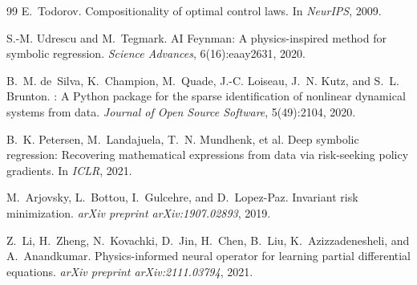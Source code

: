\documentclass[twoside,11pt]{article}
\begin{document}
\begin{thebibliography}{99}
E.~Todorov.
\newblock Compositionality of optimal control laws.
\newblock In \emph{NeurIPS}, 2009.

S.-M. Udrescu and M.~Tegmark.
\newblock AI Feynman: A physics-inspired method for symbolic regression.
\newblock \emph{Science Advances}, 6(16):eaay2631, 2020.


B.~M. de~Silva, K.~Champion, M.~Quade, J.-C. Loiseau, J.~N. Kutz, and S.~L. Brunton.
: A {Python} package for the sparse identification of nonlinear dynamical systems from data.
\newblock \emph{Journal of Open Source Software}, 5(49):2104, 2020.

B.~K. Petersen, M.~Landajuela, T.~N. Mundhenk, et al.
\newblock Deep symbolic regression: Recovering mathematical expressions from data via risk-seeking policy gradients.
\newblock In \emph{ICLR}, 2021.

M.~Arjovsky, L.~Bottou, I.~Gulcehre, and D.~Lopez-Paz.
\newblock Invariant risk minimization.
\newblock \emph{arXiv preprint arXiv:1907.02893}, 2019.

Z.~Li, H.~Zheng, N.~Kovachki, D.~Jin, H.~Chen, B.~Liu, K.~Azizzadenesheli, and A.~Anandkumar.
\newblock Physics-informed neural operator for learning partial differential equations.
\newblock \emph{arXiv preprint arXiv:2111.03794}, 2021.


\end{thebibliography}
\end{document}

